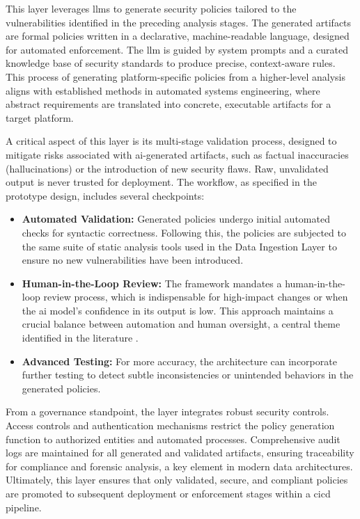 This layer leverages \glspl{llm} to generate security policies tailored to the vulnerabilities identified in the preceding analysis stages. The generated artifacts are formal policies written in a declarative, machine-readable language, designed for automated enforcement. The \gls{llm} is guided by system prompts and a curated knowledge base of security standards to produce precise, context-aware rules. This process of generating platform-specific policies from a higher-level analysis aligns with established methods in automated systems engineering, where abstract requirements are translated into concrete, executable artifacts for a target platform\cite{fakih_llm4cve_2025}.

A critical aspect of this layer is its multi-stage validation process, designed to mitigate risks associated with \gls{ai}-generated artifacts, such as factual inaccuracies (hallucinations) or the introduction of new security flaws. Raw, unvalidated output is never trusted for deployment. The workflow, as specified in the prototype design, includes several checkpoints:

\begin{itemize}
    \item \textbf{Automated Validation:} Generated policies undergo initial automated checks for syntactic correctness. Following this, the policies are subjected to the same suite of static analysis tools used in the Data Ingestion Layer to ensure no new vulnerabilities have been introduced.

    \item \textbf{Human-in-the-Loop Review:} The framework mandates a human-in-the-loop review process, which is indispensable for high-impact changes or when the \gls{ai} model's confidence in its output is low. This approach maintains a crucial balance between automation and human oversight, a central theme identified in the literature \cite{lim_explicate_2025}.
    
    \item \textbf{Advanced Testing:} For more accuracy, the architecture can incorporate further testing to detect subtle inconsistencies or unintended behaviors in the generated policies.
\end{itemize}

From a governance standpoint, the layer integrates robust security controls. Access controls and authentication mechanisms restrict the policy generation function to authorized entities and automated processes. Comprehensive audit logs are maintained for all generated and validated artifacts, ensuring traceability for compliance and forensic analysis, a key element in modern data architectures\cite{noauthor_testbed_2025}. Ultimately, this layer ensures that only validated, secure, and compliant policies are promoted to subsequent deployment or enforcement stages within a \gls{cicd} pipeline.

